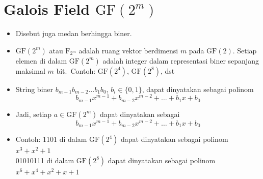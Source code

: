 \documentclass{article}
\begin{document}

\section*{Galois Field $\text{GF}(2^m)$}

\begin{itemize}
    \item Disebut juga medan berhingga biner.
    \item $\text{GF}(2^m)$ atau $\text{F}_{2^m}$ adalah ruang vektor berdimensi $m$ pada $\text{GF}(2)$. Setiap elemen di dalam $\text{GF}(2^m)$ adalah integer dalam representasi biner sepanjang maksimal $m$ bit.\
    Contoh: $\text{GF}(2^4)$, $\text{GF}(2^8)$, dst
    \item String biner $b_{m-1}b_{m-2} \dots b_1b_0$, $b_i \in \{0,1\}$, dapat dinyatakan sebagai polinom
    \[ b_{m-1}x^{m-1} + b_{m-2}x^{m-2} + \dots + b_1x + b_0 \]
    \item Jadi, setiap $a \in \text{GF}(2^m)$ dapat dinyatakan sebagai
    \[ b_{m-1}x^{m-1} + b_{m-2}x^{m-2} + \dots + b_1x + b_0 \]
    \item Contoh: 1101 di dalam $\text{GF}(2^4)$ dapat dinyatakan sebagai polinom $x^3 + x^2 + 1$\\
    01010111 di dalam $\text{GF}(2^8)$ dapat dinyatakan sebagai polinom $x^6 + x^4 + x^2 + x + 1$
\end{itemize}
\end{document}
